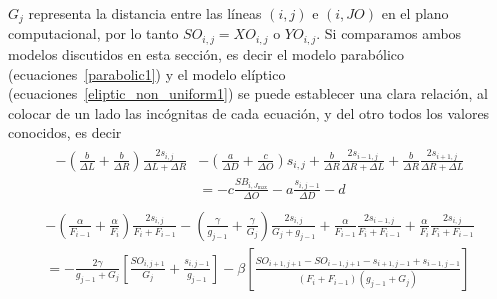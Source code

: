 \documentclass[letterpaper, openright, 12pt]{book}
\begin{document}
    $G_j$ representa la distancia entre las líneas $(i, j)$ e $(i, JO)$ en
    el plano computacional, por lo tanto $SO_{i, j} = XO_{i, j}$ o
    $YO_{i, j}$. Si comparamos ambos modelos discutidos en esta sección, es
    decir el modelo parabólico (ecuaciones~\ref{parabolic1}) y el modelo
    elíptico (ecuaciones~\ref{eliptic_non_uniform1}) se puede establecer una
    clara relación, al colocar de un lado las incógnitas de cada ecuación, y
    del otro todos los valores conocidos, es decir
    \begin{align}
        \begin{aligned}
            -\left( \frac{b}{\Delta L} + \frac{b}{\Delta R} \right)
                \frac{2 s_{i, j}}{\Delta L + \Delta R} &
                - \left( \frac{a}{\Delta D}
                + \frac{c}{\Delta O}\right) s_{i, j} + \frac{b}{\Delta R}
                \frac{2 s_{i-1, j}}{\Delta R + \Delta L}
                + \frac{b}{\Delta R} \frac{2 s_{i+1, j}}{\Delta R + \Delta L}\\
            &= - c \frac{SB_{i, J_{\max}}}{\Delta O}
                - a \frac{s_{i, j-1}}{\Delta D} - d
        \end{aligned}
    \end{align}
    \begin{align}
        \begin{aligned}
            -\left( \frac{\alpha}{F_{i - 1}} + \frac{\alpha}{F_i} \right)
                \frac{2s_{i, j}}{F_i + F_{i - 1}}
                - \left( \frac{\gamma}{g_{j - 1}} + \frac{\gamma}{G_j} \right)
                \frac{2s_{i, j}}{G_j + g_{j-1}} + \frac{\alpha}{F_{i - 1}}
                \frac{2 s_{i-1, j}}{F_i + F_{i - 1}} + \frac{\alpha}{F_i}
                \frac{2 s_{i, j}}{F_i + F_{i - 1}}\\
            = - \frac{2\gamma}{g_{j - 1} + G_j} \left[ \frac{SO_{i, j+1}}{G_j}
                + \frac{s_{i, j-1}}{g_{j -1}} \right]
                - \beta \left[ \frac{SO_{i+1, j+1} - SO_{i-1, j+1}
                - s_{i+1, j-1} + s_{i-1, j-1} }{ \left( F_i + F_{i - 1} \right)
                \left( g_{j - 1} + G_j \right) } \right]
        \end{aligned}
    \end{align}\\
\end{document}
